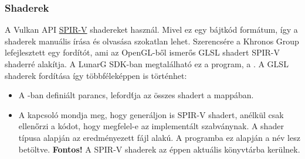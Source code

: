 \subsubsection{Shaderek}\label{shadercompilation}
A Vulkan API \href{https://www.khronos.org/spir/}{SPIR-V} shadereket haszn\'al. Mivel ez egy b\'ajtk\'od form\'atum, \'igy a shaderek manu\'alis \'ir\'asa \'es olvas\'asa szokatlan lehet. 
Szerencs\'ere a Khronos Group lefejlesztett egy ford\'it\'ot, ami az OpenGL-b\H ol ismer\H os GLSL shadert SPIR-V shaderr\'e alak\'itja. A LunarG SDK-ban megtal\'alhat\'o ez a program, a 
. \newline
A GLSL shaderek ford\'it\'asa \'igy t\"obbf\'elek\'eppen is t\"ort\'enhet:
\begin{itemize}
	\item {} \newline
		A -ban defini\'alt parancs, leford\'tja az \"osszes shadert a  mapp\'aban.
	\item {} \newline
		A  kapcsol\'o mondja meg, hogy gener\'aljon is SPIR-V shadert, an\'elk\"ul csak ellen\H orzi a k\'odot, hogy megfelel-e az implement\'alt szabv\'anynak.
		A shader t\'ipusa alapj\'an az eredm\'enyezett f\'ajl  alak\'u. A programba ez alapj\'an a n\'ev lesz bet\"oltve.
		\textbf{Fontos!} A SPIR-V shaderek az \'eppen aktu\'alis k\"onyvt\'arba ker\"ulnek. 
\end{itemize}
